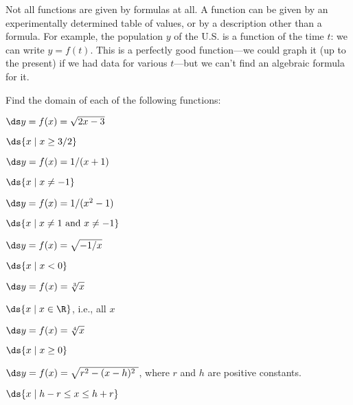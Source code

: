 Not all functions are given by formulas at all.  A function can be
given by an experimentally determined table of values, or by a
description other than a formula.  For example, the population $y$ of
the U.S. is a function of the time $t$: we can write $y=f(t)$.  This
is a perfectly good function---we could graph it (up to the
present) if we had data for various $t$---but we can't find an
algebraic formula for it.

\begin{exercises}

Find the domain of each of the following functions:

\begin{exercise} $\ds y=f(x)=\sqrt{2x-3}$
\begin{answer} $\ds \{x\mid x\ge 3/2\}$
\end{answer}\end{exercise}
\begin{exercise} $\ds y=f(x)=1/(x+1)$
\begin{answer} $\ds \{x\mid x\not=-1\}$
\end{answer}\end{exercise}
\begin{exercise} $\ds y=f(x)=1/(x^2-1)$
\begin{answer} $\ds \{x\mid x\not=1 \hbox{ and } x\not=-1\}$
\end{answer}\end{exercise}
\begin{exercise} $\ds y=f(x)=\sqrt{-1/x}$
\begin{answer} $\ds \{x\mid x<0\}$
\end{answer}\end{exercise}
\begin{exercise} $\ds y=f(x)={\root 3 \of x}$
\begin{answer} $\ds \{x\mid x\in \R\}$, i.e., all $x$
\end{answer}\end{exercise}
\begin{exercise} $\ds y=f(x)={\root 4 \of x}$
\begin{answer} $\ds \{x\mid x\ge0\}$
\end{answer}\end{exercise}
\begin{exercise} $\ds y=f(x)=\sqrt{r^2-(x-h)^2\ }$, where
$r$ and $h$ are positive constants.
\begin{answer} $\ds \{x\mid h-r\le x\le h+r\}$
\end{answer}\end{exercise}

\end{exercises}
